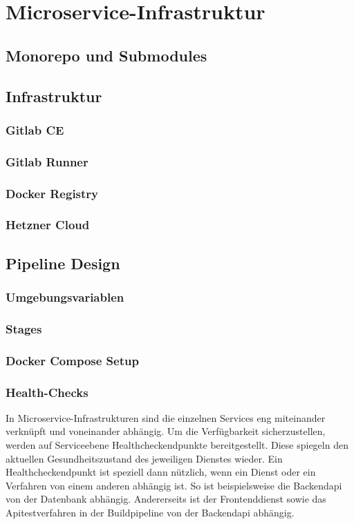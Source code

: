 \chapter{Microservice-Infrastruktur}

\section{Monorepo und Submodules}

\section{Infrastruktur}
\subsection{Gitlab CE}
\subsection{Gitlab Runner}
\subsection{Docker Registry}
\subsection{Hetzner Cloud}

\section{Pipeline Design}
\subsection{Umgebungsvariablen}

\subsection{Stages}
\subsection{Docker Compose Setup}

\subsection{Health-Checks}
In Microservice-Infrastrukturen sind die einzelnen Services eng miteinander verknüpft
und voneinander abhängig. Um die Verfügbarkeit sicherzustellen, werden auf
Serviceebene Healthcheckendpunkte bereitgestellt. Diese spiegeln den aktuellen
Gesundheitszustand des jeweiligen Dienstes wieder. Ein Healthcheckendpunkt
ist speziell dann nützlich, wenn ein Dienst oder ein Verfahren von einem anderen
abhängig ist. So ist beispielsweise die Backendapi von der Datenbank
abhängig. Andererseits ist der Frontenddienst sowie das Apitestverfahren
in der Buildpipeline von der Backendapi abhängig. 

